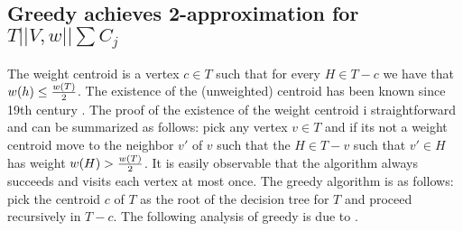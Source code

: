 \subsection{Greedy achieves 2-approximation for $T||V,w||\sum C_j$}
The weight centroid is a vertex $c\in T$ such that for every $H\in T-c$ we have that $w\mathopen{}\left( h \right)\leq \frac{w\mathopen{}\left( T \right)}{2}$. The existence of the (unweighted) centroid has been known since 19th century \cite{Jordan1869}. The proof of the existence of the weight centroid i straightforward and can be summarized as follows: pick any vertex $v\in T$ and if its not a weight centroid move to the neighbor $v'$ of $v$ such that the $H\in T-v$ such that $v'\in H$ has weight $w\mathopen{}\left( H \right)>\frac{w\mathopen{}\left( T \right)}{2}$. It is easily observable that the algorithm always succeeds and visits each vertex at most once. The greedy algorithm is as follows: pick the centroid $c$ of $T$ as the root of the decision tree for $T$ and proceed recursively in $T-c$. The following analysis of greedy is due to \cite{Fast_app_centroid_trees}.


